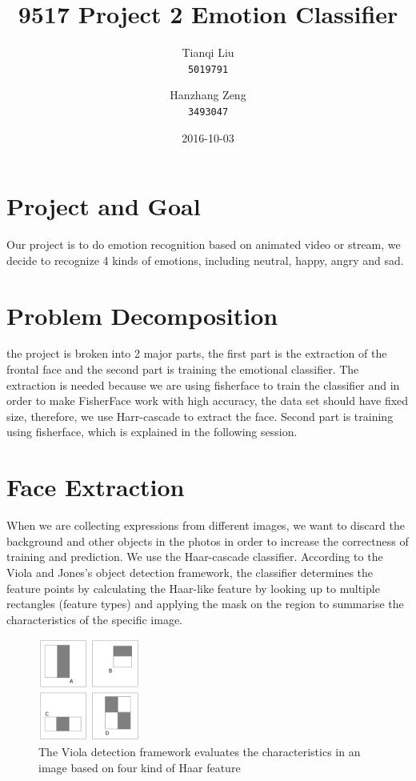 \documentclass[10pt,a4paper]{article}
\title {9517 Project 2 Emotion Classifier}
\date {2016-10-03}
\author {Tianqi Liu\\
        \texttt{5019791}
        \and
        Hanzhang Zeng\\
        \texttt{3493047}
        }
\begin{document}
	\maketitle
	\newpage
  \section {Project and Goal}
  Our project is to do emotion recognition based on animated video or stream, we decide to recognize 4 kinds of emotions, including neutral, happy, angry and sad.

  \section {Problem Decomposition}
  the project is broken into 2 major parts, the first part is the extraction of the frontal face and the second part is training the emotional classifier. The extraction is needed because we are using fisherface to train the classifier and in order to make FisherFace work with high accuracy, the data set should have fixed size, therefore, we use Harr-cascade to extract the face. Second part is training using fisherface, which is explained in the following session.

  \section {Face Extraction}
	When we are collecting expressions from different images, we want to discard the background and other objects in the photos in order to increase the correctness of training and prediction. We use the Haar-cascade classifier. According to the Viola and Jones's object detection framework, the classifier determines the feature points by calculating the Haar-like feature by looking up to multiple rectangles (feature types) and applying the mask on the region to summarise the characteristics of the specific image.
	\begin{figure}[!ht]
  	\centering
      	\includegraphics[width=0.3\textwidth]{Viola_Detector.png}
  	\caption{The Viola detection framework evaluates the characteristics in an image based on four kind of Haar feature}
	\end{figure}\\
\end{document}
